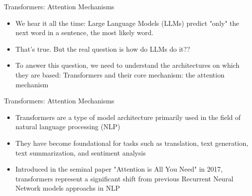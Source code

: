 \begin{frame}{Transformers: Attention Mechanisms}
  \begin{itemize}
      \item We hear it all the time: Large Language Models (LLMs) predict "only" the next word in a sentence, the most likely word.
      \item That's true. But the real question is how do LLMs do it??
      \item To answer this question, we need to understand the architectures on which they are based: Transformers and their core mechanism: the attention mechanism
  \end{itemize}
\end{frame}


\begin{frame}{Transformers: Attention Mechanisms}
    \begin{itemize}
        \item Transformers are a type of model architecture primarily used in the field of natural language processing (NLP)
        \item They have become foundational for tasks such as translation, text generation, text summarization, and sentiment analysis
        \item Introduced in the seminal paper "Attention is All You Need" in 2017, transformers represent a significant shift from previous Recurrent Neural Network models approachs in NLP
      \end{itemize}
\end{frame}

